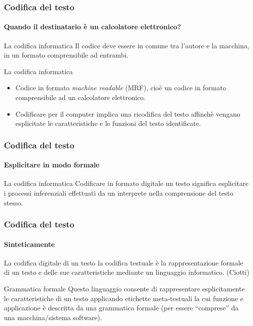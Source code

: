 \begin{frame}
	\frametitle{Codifica del testo}
	\framesubtitle{Quando il destinatario è un calcolatore elettronico?}
	\addtocounter{nframe}{1}

	\begin{block}{La codifica informatica}
		Il codice deve essere in comune tra l'autore e la macchina, in un formato comprensibile ad entrambi.
	\end{block}

	\begin{block}{La codifica informatica}
		\begin{itemize}
			\item Codice in formato \textit{machine readable} (MRF), cioè un codice in formato comprensibile ad un calcolatore elettronico.
			\item Codificare per il computer implica una ricodifica del testo affinchè vengano esplicitate le caratteristiche e le funzioni del testo identificate.
		\end{itemize}
	\end{block}

\end{frame}

\begin{frame}
	\frametitle{Codifica del testo}
	\framesubtitle{Esplicitare in modo formale}
	\addtocounter{nframe}{1}

	\begin{block}{La codifica informatica}
		Codificare in formato digitale un testo significa esplicitare i processi inferenziali effettuati da un interprete nella comprensione del testo stesso.
	\end{block}


\end{frame}


\begin{frame}
	\frametitle{Codifica del testo}
	\framesubtitle{Sinteticamente}
	\addtocounter{nframe}{1}

	\begin{block}{La codifica digitale di un testo}
		la codifica testuale è la rappresentazione formale di un testo e delle sue caratteristiche mediante un linguaggio informatico. (Ciotti)
	\end{block}

	\begin{block}{Grammatica formale}
		Questo linguaggio consente di rappresentare esplicitamente le caratteristiche di un testo applicando etichette meta-testuali la cui funzione e applicazione è descritta da una grammatica formale (per essere ``comprese'' da una macchina/sistema software).
	\end{block}
\end{frame}

